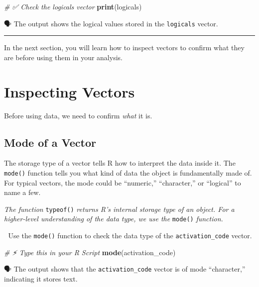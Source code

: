 \documentclass[
  12pt,
]{scrreprt}
\newenvironment{Shaded}{\begin{snugshade}}{\end{snugshade}}
\newcommand{\CommentTok}[1]{\textcolor[rgb]{0.56,0.35,0.01}{\textit{#1}}}
\newcommand{\FunctionTok}[1]{\textcolor[rgb]{0.13,0.29,0.53}{\textbf{#1}}}
\newcommand{\NormalTok}[1]{#1}
\begin{document}
\begin{Shaded}
\begin{Highlighting}[]
\CommentTok{\# ✅ Check the logicals vector}
\FunctionTok{print}\NormalTok{(logicals)}
\end{Highlighting}
\end{Shaded}

🗣 The output shows the logical values stored in the \texttt{logicals}
vector.

\begin{center}\rule{0.5\linewidth}{0.5pt}\end{center}

In the next section, you will learn how to inspect vectors to confirm
what they are before using them in your analysis.

\chapter{Inspecting Vectors}\label{inspecting-vectors}

Before using data, we need to confirm \emph{what} it is.

\section{Mode of a Vector}\label{mode-of-a-vector}

The storage type of a vector tells R how to interpret the data inside
it. The \texttt{mode()} function tells you what kind of data the object
is fundamentally made of. For typical vectors, the mode could be
``numeric,'' ``character,'' or ``logical'' to name a few.

\emph{The function} \texttt{typeof()} \emph{returns R's internal storage
type of an object. For a higher-level understanding of the data type, we
use the} \texttt{mode()} \emph{function.}

🎯 Use the \texttt{mode()} function to check the data type of the
\texttt{activation\_code} vector.

\begin{Shaded}
\begin{Highlighting}[]
\CommentTok{\# ⚡ Type this in your R Script}
\FunctionTok{mode}\NormalTok{(activation\_code)}
\end{Highlighting}
\end{Shaded}

🗣 The output shows that the \texttt{activation\_code} vector is of mode
``character,'' indicating it stores text.
\end{document}
